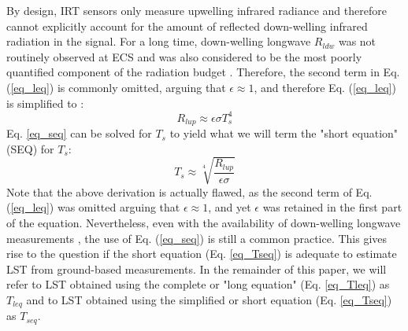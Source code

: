 \documentclass[fleqn,10pt]{wlscirep}
\begin{document}
By design, IRT sensors only measure upwelling infrared radiance and therefore cannot explicitly account for the amount of reflected down-welling infrared radiation in the signal. For a long time, down-welling longwave $R_{ldw}$ was not routinely observed at ECS \cite{wang_evaluation_2009-1} and was also considered to be the most poorly quantified component of the radiation budget \cite{trenberth2012tracking}. Therefore, the second term in Eq. (\ref{eq_leq}) is commonly omitted, arguing that $\epsilon\approx 1$, and therefore Eq. (\ref{eq_leq}) is simplified to \cite{crago_use_2014-3}:
\begin{equation}\label{eq_seq}
R_{lup} \approx \epsilon \sigma T_{s}^{4}
\end{equation} 
Eq. \ref{eq_seq} can be solved for $T_s$ to yield what we will term the "short equation" (SEQ) for $T_s$:
\begin{equation}\label{eq_Tseq}
T_{s} \approx \sqrt[4]{\frac{R_{lup}}{\epsilon \sigma}}
\end{equation} 
Note that the above derivation is actually flawed, as the second term of Eq. (\ref{eq_leq}) was omitted arguing that $\epsilon\approx 1$, and yet $\epsilon$ was retained in the first part of the equation. Nevertheless, even with the availability of down-welling longwave measurements \cite{stephens1995review}, the use of Eq. (\ref{eq_seq}) is still a common practice\cite{crago_use_2014-2}. This gives rise to the question if the short equation (Eq. \ref{eq_Tseq}) is adequate to estimate LST from ground-based measurements. In the remainder of this paper, we will refer to LST obtained using the complete or "long equation" (Eq. \ref{eq_Tleq}) as $T_{leq}$ and to LST obtained using the simplified or short equation (Eq. \ref{eq_Tseq}) as $T_{seq}$.

\end{document}

